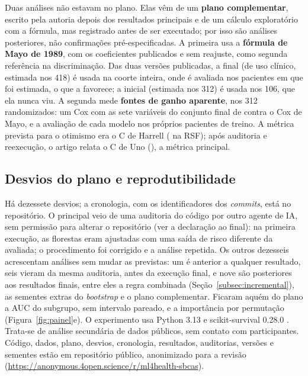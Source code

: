 \documentclass[12pt]{article}
\begin{document}
Duas análises não estavam no plano. Elas vêm de um \textbf{plano complementar}, escrito pela autoria depois dos resultados principais e de um cálculo exploratório com a fórmula, mas registrado antes de ser executado; por isso são análises posteriores, não confirmações pré-especificadas. A primeira usa a \textbf{fórmula de Mayo de 1989}, com os coeficientes publicados e sem reajuste, como segunda referência na discriminação. Das duas versões publicadas, a final (de uso clínico, estimada nos 418) é usada na coorte inteira, onde é avaliada nos pacientes em que foi estimada, o que a favorece; a inicial (estimada nos 312) é usada nos 106, que ela nunca viu. A segunda mede \textbf{fontes de ganho aparente}, nos 312 randomizados: um Cox com as sete variáveis do conjunto final de \cite{graf2026coxrsf} contra o Cox de Mayo, e a avaliação de cada modelo nos próprios pacientes de treino. A métrica prevista para o otimismo era o C de Harrell (\otimRSFHarrell{} na RSF); após auditoria e reexecução, o artigo relata o C de Uno (\otimRSF), a métrica principal.

\subsection{Desvios do plano e reprodutibilidade}\label{subsec:desvios}

Há dezessete desvios; a cronologia, com os identificadores dos \textit{commits}, está no repositório. O principal veio de uma auditoria do código por outro agente de IA, sem permissão para alterar o repositório (ver a declaração ao final): na primeira execução, as florestas eram ajustadas com uma saída de risco diferente da avaliada; o procedimento foi corrigido e a análise repetida. Os outros dezesseis acrescentam análises sem mudar as previstas: um é anterior a qualquer resultado, seis vieram da mesma auditoria, antes da execução final, e nove são posteriores aos resultados finais, entre eles a regra combinada (Seção~\ref{subsec:incremental}), as sementes extras do \textit{bootstrap} e o plano complementar. Ficaram aquém do plano a AUC do subgrupo, sem intervalo pareado, e a importância por permutação (Figura~\ref{fig:painel}e). O experimento usa Python 3.13 e scikit-survival 0.28.0 \cite{polsterl2020sksurv}. Trata-se de análise secundária de dados públicos, sem contato com participantes. Código, dados, plano, desvios, cronologia, resultados, auditorias, versões e sementes estão em repositório público, anonimizado para a revisão (\url{https://anonymous.4open.science/r/ml4health-sbcas}).
\end{document}
